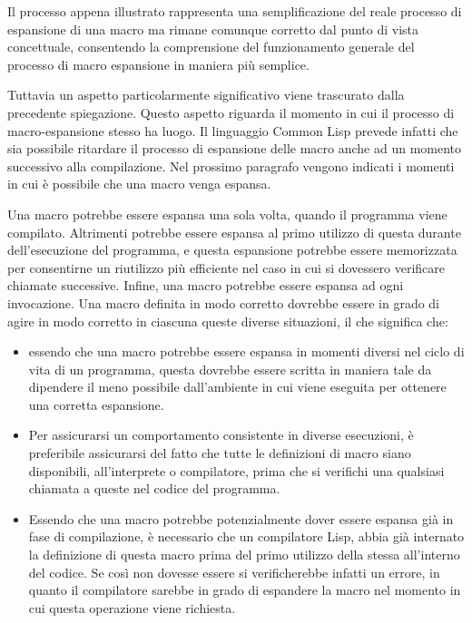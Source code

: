 Il processo appena illustrato rappresenta una semplificazione del reale processo
di espansione di una macro ma rimane comunque corretto dal punto di vista
concettuale, consentendo la comprensione del funzionamento generale del
processo di macro espansione in maniera più semplice.

Tuttavia un aspetto particolarmente significativo viene trascurato dalla
precedente spiegazione. Questo aspetto riguarda il momento in cui il processo di
macro-espansione stesso ha luogo. Il linguaggio Common Lisp prevede infatti che
sia possibile ritardare il processo di espansione delle macro anche ad un
momento successivo alla compilazione. Nel prossimo paragrafo vengono indicati i
momenti in cui è possibile che una macro venga espansa.

Una macro potrebbe essere espansa una sola volta, quando il programma viene
compilato. Altrimenti potrebbe essere espansa al primo utilizzo di questa
durante dell’esecuzione del programma, e questa espansione potrebbe essere
memorizzata per consentirne un riutilizzo più efficiente nel caso in cui si
dovessero verificare chiamate successive. Infine, una macro potrebbe essere
espansa ad ogni invocazione. Una macro definita in modo corretto dovrebbe essere
in grado di agire in modo corretto in ciascuna queste diverse situazioni, il che
significa che:

\begin{itemize}

\item essendo che una macro potrebbe essere espansa in momenti diversi nel ciclo
di vita di un programma, questa dovrebbe essere scritta in maniera tale da
dipendere il meno possibile dall’ambiente in cui viene eseguita per ottenere una
corretta espansione.

\item Per assicurarsi un comportamento consistente in diverse esecuzioni, è
preferibile assicurarsi del fatto che tutte le definizioni di macro siano
disponibili, all’interprete o compilatore, prima che si verifichi una qualsiasi
chiamata a queste nel codice del programma.

\item Essendo che una macro potrebbe potenzialmente dover essere espansa già in
fase di compilazione, è necessario che un compilatore Lisp, abbia già internato
la definizione di questa macro prima del primo utilizzo della stessa all’interno
del codice. Se così non dovesse essere si verificherebbe infatti un errore, in
quanto il compilatore sarebbe in grado di espandere la macro nel momento in cui
questa operazione viene richiesta.

\end{itemize}

